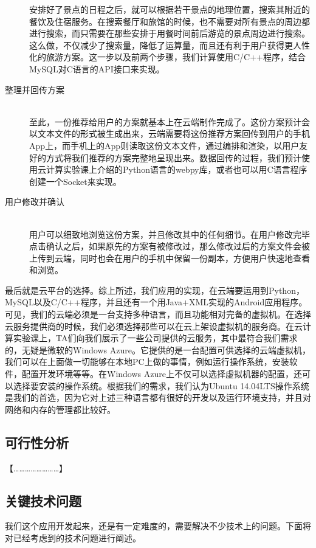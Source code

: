 \documentclass[12pt,a4paper]{article}
\begin{document}
\begin{CJK}{UTF8}{gbsn}
\begin{description}
	安排好了景点的日程之后，就可以根据若干景点的地理位置，搜索其附近的餐饮及住宿服务。在搜索餐厅和旅馆的时候，也不需要对所有景点的周边都进行搜索，而只需要在那些安排于用餐时间前后游览的景点周边进行搜索。这么做，不仅减少了搜索量，降低了运算量，而且还有利于用户获得更人性化的旅游方案。这一步以及前两个步骤，我们计算使用C{\slash}C++程序，结合MySQL对C语言的API接口来实现。
	\item[整理并回传方案] \hfill \\
	至此，一份推荐给用户的方案就基本上在云端制作完成了。这份方案预计会以文本文件的形式被生成出来，云端需要将这份推荐方案回传到用户的手机App上，而手机上的App则读取这份文本文件，通过编排和渲染，以用户友好的方式将我们推荐的方案完整地呈现出来。数据回传的过程，我们预计使用云计算实验课上介绍的Python语言的webpy库，或者也可以用C语言程序创建一个Socket来实现。
	\item[用户修改并确认] \hfill \\
	用户可以细致地浏览这份方案，并且修改其中的任何细节。在用户修改完毕点击确认之后，如果原先的方案有被修改过，那么修改过后的方案文件会被上传到云端，同时也会在用户的手机中保留一份副本，方便用户快速地查看和浏览。
	\end{description}

	最后就是云平台的选择。综上所述，我们应用的实现，在云端要运用到Python，MySQL以及C{\slash}C++程序，并且还有一个用Java+XML实现的Android应用程序。可见，我们的云端必须是一台支持多种语言，而且功能相对完备的虚拟机。在选择云服务提供商的时候，我们必须选择那些可以在云上架设虚拟机的服务商。在云计算实验课上，TA们向我们展示了一些公司提供的云服务，其中最符合我们需求的，无疑是微软的Windows Azure。它提供的是一台配置可供选择的云端虚拟机，我们可以在上面做一切能够在本地PC上做的事情，例如运行操作系统，安装软件，配置开发环境等等。在Windows Azure上不仅可以选择虚拟机器的配置，还可以选择要安装的操作系统。根据我们的需求，我们认为Ubuntu 14.04LTS操作系统是我们的首选，因为它对上述三种语言都有很好的开发以及运行环境支持，并且对网络和内存的管理都比较好。
	
	\subsection{可行性分析}
	{\color{red} 【……………………】}

	\subsection{关键技术问题}
	我们这个应用开发起来，还是有一定难度的，需要解决不少技术上的问题。下面将对已经考虑到的技术问题进行阐述。
	

\end{CJK}
\end{document}
